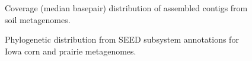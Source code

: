 \documentclass[11pt]{article} %
\begin{document}
\begin{figure}[ht]
\caption{Coverage (median basepair) distribution of assembled contigs
  from soil metagenomes.}
\label{soilassemblycoverage}
\end{figure}

\begin{figure}[ht]
\caption{Phylogenetic distribution from SEED subsystem annotations for
  Iowa corn and prairie metagenomes.}
\label{phyla}
\end{figure}
\end{document}
